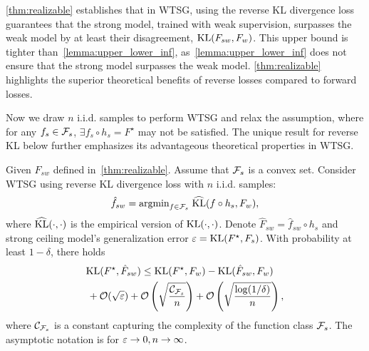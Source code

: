 \cref{thm:realizable} establishes that in WTSG, using the reverse KL divergence loss guarantees that the strong model, trained with weak supervision, surpasses the weak model by at least their disagreement, $\mathrm{KL}(F_{sw}, F_w)$.
This upper bound is tighter than~\cref{lemma:upper_lower_inf}, as~\cref{lemma:upper_lower_inf} does not ensure that the strong model surpasses the weak model.
\cref{thm:realizable} highlights the superior theoretical benefits of reverse losses compared to forward losses.


Now we draw $n$ i.i.d. samples to perform WTSG and relax the assumption, where for any $f_s \in \mathcal{F}_s$, $\exists f_s \circ h_s = F^\star$ may not be satisfied.
The unique result for reverse KL below further emphasizes its advantageous theoretical properties in WTSG.

\begin{theorem} \label{thm:non-realizable-finite-samples}
Given $F_{sw}$ defined in~\cref{thm:realizable}.
Assume that $\mathcal{F}_s$ is a convex set.
Consider WTSG using reverse KL divergence loss with $n$ i.i.d. samples:
\begin{align*}
    \hat{f}_{sw} = \text{argmin}_{f \in \mathcal{F}_{s}}\; \widehat{\mathrm{KL}}(f \circ h_s, F_w),
\end{align*}
where $\widehat{\mathrm{KL}}(\cdot, \cdot)$
is the empirical version of $\mathrm{KL}(\cdot, \cdot)$.
Denote $\hat{F}_{sw}=\hat{f}_{sw} \circ h_s$ and strong ceiling model's generalization error $\varepsilon = \mathrm{KL}(F^\star, F_s)$.
With probability at least $1-\delta$, there holds
\begin{align*} 
& \mathrm{KL}(F^\star, \hat{F}_{sw}) \le \mathrm{KL}(F^\star, F_w) - \mathrm{KL}(\hat{F}_{sw}, F_w) \\ & \hspace{0.05cm} + \mathcal{O}(\sqrt{\varepsilon}) +  \mathcal{O}\left(\sqrt{\frac{\mathcal{C}_{\mathcal{F}_s}}{n}}\right) + \mathcal{O}\left(\sqrt{\frac{\log(1/\delta)}{n}}\right),
\end{align*}
where $\mathcal{C}_{\mathcal{F}_s}$ is a constant capturing the complexity of the function class $\mathcal{F}_s$.
The asymptotic notation is for $\varepsilon \to 0, n \to \infty$.
\end{theorem}


